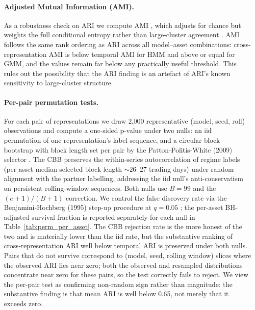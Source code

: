 \documentclass[preprint,12pt,authoryear]{elsarticle}
\begin{document}
\paragraph{Adjusted Mutual Information (AMI).}
As a robustness check on ARI we compute AMI \citep{VinhEppsBailey2010}, which adjusts for chance but weights the full conditional entropy rather than large-cluster agreement \citep{WarrensvanderHoef2022}. AMI follows the same rank ordering as ARI across all model--asset combinations: cross-representation AMI is below temporal AMI for HMM and above or equal for GMM, and the values remain far below any practically useful threshold. This rules out the possibility that the ARI finding is an artefact of ARI's known sensitivity to large-cluster structure.

\paragraph{Per-pair permutation tests.}
For each pair of representations we draw 2{,}000 representative (model, seed, roll) observations and compute a one-sided p-value under two nulls: an iid permutation of one representation's label sequence, and a circular block bootstrap with block length set per pair by the Patton-Politis-White (2009) selector \citep{PolitisRomano1992CBB,PattonPolitisWhite2009}. The CBB preserves the within-series autocorrelation of regime labels (per-asset median selected block length ${\sim}26$--$27$ trading days) under random alignment with the partner labelling, addressing the iid null's anti-conservatism on persistent rolling-window sequences. Both nulls use $B=99$ and the $(e+1)/(B+1)$ correction. We control the false discovery rate via the Benjamini-Hochberg (1995) step-up procedure at $q=0.05$ \citep{BenjaminiHochberg1995}; the per-asset BH-adjusted survival fraction is reported separately for each null in Table~\ref{tab:perm_per_asset}. The CBB rejection rate is the more honest of the two and is materially lower than the iid rate, but the substantive ranking of cross-representation ARI well below temporal ARI is preserved under both nulls. Pairs that do not survive correspond to (model, seed, rolling window) slices where the observed ARI lies near zero; both the observed and resampled distributions concentrate near zero for these pairs, so the test correctly fails to reject. We view the per-pair test as confirming non-random sign rather than magnitude: the substantive finding is that mean ARI is well below 0.65, not merely that it exceeds zero.
\end{document}
